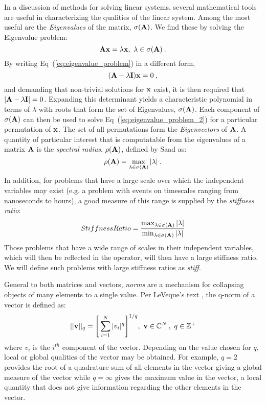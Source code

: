 In a discussion of methods for solving linear systems, several
mathematical tools are useful in characterizing the qualities of the
linear system. Among the most useful are the \textit{Eigenvalues} of
the matrix, $\sigma(\mathbf{A})$. We find these by solving the Eigenvalue
problem:
\begin{equation}
  \mathbf{A} \mathbf{x} = \lambda \mathbf{x},\ \lambda \in \sigma(\mathbf{A})\:.
  \label{eq:eigenvalue_problem}
\end{equation}
By writing Eq~(\ref{eq:eigenvalue_problem}) in a different form,
\begin{equation}
  (\mathbf{A} - \lambda \mathbf{I})\mathbf{x} = 0 \:,
  \label{eq:eigenvalue_problem_2}
\end{equation}
and demanding that non-trivial solutions for $\mathbf{x}$ exist, it is
then required that $|\mathbf{A} - \lambda \mathbf{I}| = 0$. Expanding this
determinant yields a characteristic polynomial in terms of $\lambda$
with roots that form the set of Eigenvalues, $\sigma(\mathbf{A})$. Each
component of $\sigma(\mathbf{A})$ can then be used to solve
Eq~(\ref{eq:eigenvalue_problem_2}) for a particular permutation of
$\mathbf{x}$. The set of all permutations form the \textit{Eigenvectors}
of $\mathbf{A}$. A quantity of particular interest that is computatable
from the eigenvalues of a matrix $\mathbf{A}$ is the \textit{spectral
  radius}, $\rho(\mathbf{A})$, defined by Saad \citep{saad_2003} as:
\begin{equation}
  \rho(\mathbf{A}) = \max_{\lambda \in \sigma(\mathbf{A})} |\lambda| \:.
  \label{eq:spectral_radius}
\end{equation}
In addition, for problems that have a large scale over which the
independent variables may exist (e.g. a problem with events on
timescales ranging from nanoseconds to hours), a good measure of this
range is supplied by the \textit{stiffness ratio}:
\begin{equation}
  Stiffness Ratio = \frac{\max_{\lambda \in \sigma(\mathbf{A})}
    |\lambda|}{\min_{\lambda \in \sigma(\mathbf{A})} |\lambda|}
\end{equation}
Those problems that have a wide range of scales in their independent
variables, which will then be reflected in the operator, will then
have a large stiffness ratio. We will define such problems with large
stiffness ratios as \textit{stiff}.

General to both matrices and vectors, \textit{norms} are a mechanism
for collapsing objects of many elements to a single value. Per
LeVeque's text \citep{leveque_2007}, the q-norm of a vector is defined
as:
\begin{equation}
  ||\mathbf{v}||_q = \Bigg[ \sum_{i=1}^N |v_i|^q \Bigg]^{1/q},\ \mathbf{v} \in
  \mathbb{C}^N\:,\ q \in \mathbb{Z}^+
  \label{eq:q_norm}
\end{equation}
where ${v_i}$ is the $i^{th}$ component of the vector. Depending on
the value chosen for $q$, local or global qualities of the vector may
be obtained. For example, $q=2$ provides the root of a quadrature sum
of all elements in the vector giving a global measure of the vector
while $q=\infty$ gives the maximum value in the vector, a local
quantity that does not give information regarding the other elements
in the vector.


